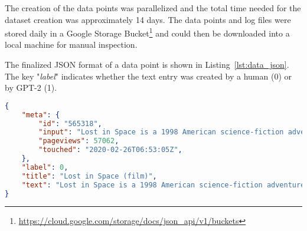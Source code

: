 The creation of the data points was parallelized and the total time needed for the dataset creation was approximately 14 days. The data points and log files were stored daily in a Google Storage Bucket\footnote{\url{https://cloud.google.com/storage/docs/json_api/v1/buckets}} and could then be downloaded into a local machine for manual inspection.

The finalized JSON format of a data point is shown in Listing~\ref{lst:data_json}. The key "\textit{label}" indicates whether the text entry was created by a human (0) or by GPT-2 (1).\\

\begin{lstlisting}[language=json,firstnumber=1,label={lst:data_json},caption={Example of a data point}]
{
	"meta": {
		"id": "565318",
		"input": "Lost in Space is a 1998 American science-fiction adventure",
		"pageviews": 57062,
		"touched": "2020-02-26T06:53:05Z",
	},
	"label": 0,
	"title": "Lost in Space (film)",
	"text": "Lost in Space is a 1998 American science-fiction adventure film directed by Stephen Hopkins, and starring William Hurt, Matt LeBlanc, and Gary Oldman. The plot is adapted from the 1965-1968 CBS television series \"of the same name\". Seve"
}
\end{lstlisting}